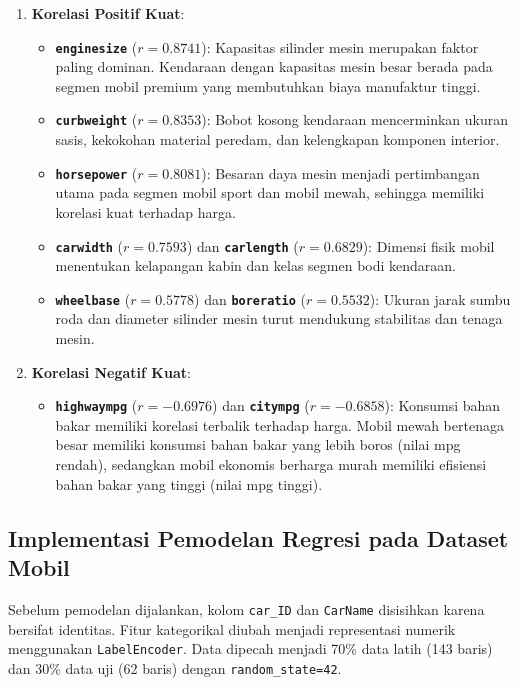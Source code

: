 \documentclass[a4paper,oneside,12pt]{report}
\begin{document}
\begin{enumerate}
    \item \textbf{Korelasi Positif Kuat}:
    \begin{itemize}
        \item \textbf{\texttt{enginesize}} ($r = 0.8741$): Kapasitas silinder mesin merupakan faktor paling dominan. Kendaraan dengan kapasitas mesin besar berada pada segmen mobil premium yang membutuhkan biaya manufaktur tinggi.
        \item \textbf{\texttt{curbweight}} ($r = 0.8353$): Bobot kosong kendaraan mencerminkan ukuran sasis, kekokohan material peredam, dan kelengkapan komponen interior.
        \item \textbf{\texttt{horsepower}} ($r = 0.8081$): Besaran daya mesin menjadi pertimbangan utama pada segmen mobil sport dan mobil mewah, sehingga memiliki korelasi kuat terhadap harga.
        \item \textbf{\texttt{carwidth}} ($r = 0.7593$) dan \textbf{\texttt{carlength}} ($r = 0.6829$): Dimensi fisik mobil menentukan kelapangan kabin dan kelas segmen bodi kendaraan.
        \item \textbf{\texttt{wheelbase}} ($r = 0.5778$) dan \textbf{\texttt{boreratio}} ($r = 0.5532$): Ukuran jarak sumbu roda dan diameter silinder mesin turut mendukung stabilitas dan tenaga mesin.
    \end{itemize}

    \item \textbf{Korelasi Negatif Kuat}:
    \begin{itemize}
        \item \textbf{\texttt{highwaympg}} ($r = -0.6976$) dan \textbf{\texttt{citympg}} ($r = -0.6858$): Konsumsi bahan bakar memiliki korelasi terbalik terhadap harga. Mobil mewah bertenaga besar memiliki konsumsi bahan bakar yang lebih boros (nilai mpg rendah), sedangkan mobil ekonomis berharga murah memiliki efisiensi bahan bakar yang tinggi (nilai mpg tinggi).
    \end{itemize}
\end{enumerate}

\subsection{Implementasi Pemodelan Regresi pada Dataset Mobil}
Sebelum pemodelan dijalankan, kolom \texttt{car\_ID} dan \texttt{CarName} disisihkan karena bersifat identitas. Fitur kategorikal diubah menjadi representasi numerik menggunakan \texttt{LabelEncoder}. Data dipecah menjadi 70\% data latih (143 baris) dan 30\% data uji (62 baris) dengan \texttt{random\_state=42}.
\end{document}
